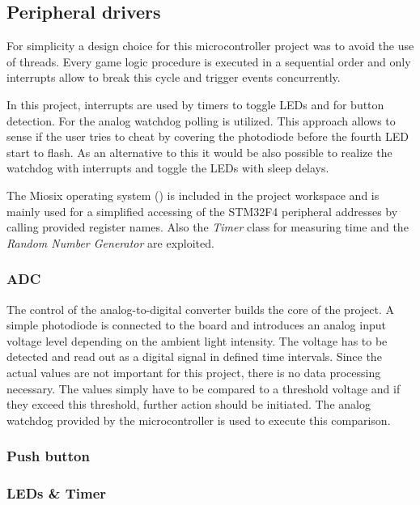 \subsection{Peripheral drivers}
For simplicity a design choice for this microcontroller project was to avoid the use of threads. Every game logic procedure is executed in a sequential order and only interrupts allow to break this cycle and trigger events concurrently.\\
\par
In this project, interrupts are used by timers to toggle LEDs and for button detection. For the analog watchdog polling is utilized.
This approach allows to sense if the user tries to cheat by covering the photodiode before the fourth LED start to flash. As an alternative to this it would be also possible to realize the watchdog with interrupts and toggle the LEDs with sleep delays.\\
\par
The Miosix operating system (\cite{Miosix}) is included in the project workspace and is mainly used for a simplified accessing of the STM32F4 peripheral addresses by calling provided register names. Also the \emph{Timer} class for measuring time and the \emph{Random Number Generator} are exploited.

\subsubsection{ADC}
The control of the analog-to-digital converter builds the core of the project. A simple photodiode is connected to the board and introduces an analog input voltage level depending on the ambient light intensity. The voltage has to be detected and read out as a digital signal in defined time intervals. Since the actual values are not important for this project, there is no data processing necessary. The values simply have to be compared to a threshold voltage and if they exceed this threshold, further action should be initiated. The analog watchdog provided by the microcontroller is used to execute this comparison.

\subsubsection{Push button}

\subsubsection{LEDs \& Timer}

